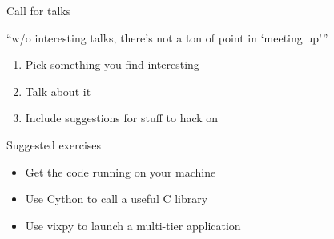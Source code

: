 \documentclass[xcolor=svgnames,17pt]{beamer}
\begin{document}
\begin{frame}
\end{frame}

\begin{frame}{Call for talks}

“w/o interesting talks, there's not a ton of point in ‘meeting up’”

\pause

\begin{enumerate}
\item Pick something you find interesting
\item Talk about it
\item Include suggestions for stuff to hack on
\end{enumerate}

\end{frame}

\begin{frame}{Suggested exercises}
\begin{itemize}
\item Get the code running on your machine
\item Use Cython to call a useful C library
\item Use vixpy to launch a multi-tier application
\end{itemize}
\end{frame}
\end{document}
